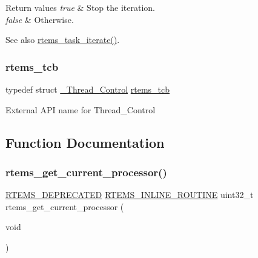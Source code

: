 \begin{DoxyRetVals}{Return values}
{\em true} & Stop the iteration. \\
\hline
{\em false} & Otherwise.\\
\hline
\end{DoxyRetVals}
\begin{DoxySeeAlso}{See also}
\mbox{\hyperlink{group__ClassicTasks_ga7255f41eb20238aebe5ce139d5dfd97d}{rtems\+\_\+task\+\_\+iterate()}}. 
\end{DoxySeeAlso}
\mbox{\label{group__ClassicTasks_gadd9f38f296a7833767355b8236f68908}} 
\subsubsection{\texorpdfstring{rtems\_tcb}{rtems\_tcb}}
{\footnotesize\ttfamily typedef struct \mbox{\hyperlink{struct__Thread__Control}{\+\_\+\+Thread\+\_\+\+Control}} \mbox{\hyperlink{group__ClassicTasks_gadd9f38f296a7833767355b8236f68908}{rtems\+\_\+tcb}}}

External A\+PI name for Thread\+\_\+\+Control 

\subsection{Function Documentation}
\mbox{\label{group__ClassicTasks_ga2017f8bfa8565df99034f362638cb89c}} 
\subsubsection{\texorpdfstring{rtems\_get\_current\_processor()}{rtems\_get\_current\_processor()}}
{\footnotesize\ttfamily \mbox{\hyperlink{group__RTEMSScoreBaseDefs_gab651a076d4d51d50221e7ef7ac99d4e7}{R\+T\+E\+M\+S\+\_\+\+D\+E\+P\+R\+E\+C\+A\+T\+ED}} \mbox{\hyperlink{group__RTEMSScoreBaseDefs_gac216239df231d5dbd15e3520b0b9313f}{R\+T\+E\+M\+S\+\_\+\+I\+N\+L\+I\+N\+E\+\_\+\+R\+O\+U\+T\+I\+NE}} uint32\+\_\+t rtems\+\_\+get\+\_\+current\+\_\+processor (\begin{DoxyParamCaption}\item[{void}]{ }\end{DoxyParamCaption})}



